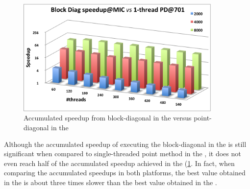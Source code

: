 \documentclass[../thesis]{subfiles}
\begin{document}
	\begin{figure}[htp]
		\begin{center}
			\includegraphics[width=0.9\textwidth]{assets/images/mic/mic-cpu-speedup-accumulated.png}
		\end{center}
		\caption{Accumulated speedup from block-diagonal in the \intel\xeonphi versus point-diagonal in the \cpu}
		\label{fig:mic:mic-cpu:speedup:accumulated}
	\end{figure}

	Although the accumulated speedup of executing the block-diagonal in the \intel\xeonphi is still significant when compared to single-threaded point method in the \cpu, it does not even reach half of the accumulated speedup achieved in the \cpu (\cref{fig:mic:mic-cpu:speedup:accumulated}. In fact, when comparing the accumulated speedups in both platforms, the best value obtained in the \intel\xeonphi is about three times slower than the best value obtained in the \cpu.
\end{document}
